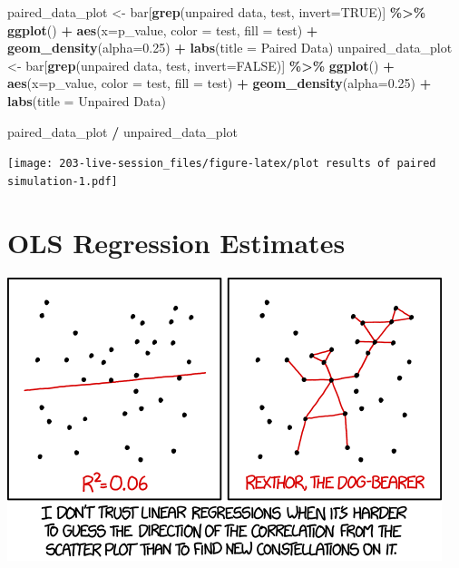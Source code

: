 \documentclass[
]{book}
\newenvironment{Shaded}{\begin{snugshade}}{\end{snugshade}}
\newcommand{\AttributeTok}[1]{\textcolor[rgb]{0.13,0.29,0.53}{#1}}
\newcommand{\ConstantTok}[1]{\textcolor[rgb]{0.56,0.35,0.01}{#1}}
\newcommand{\FloatTok}[1]{\textcolor[rgb]{0.00,0.00,0.81}{#1}}
\newcommand{\FunctionTok}[1]{\textcolor[rgb]{0.13,0.29,0.53}{\textbf{#1}}}
\newcommand{\NormalTok}[1]{#1}
\newcommand{\OtherTok}[1]{\textcolor[rgb]{0.56,0.35,0.01}{#1}}
\newcommand{\SpecialCharTok}[1]{\textcolor[rgb]{0.81,0.36,0.00}{\textbf{#1}}}
\newcommand{\StringTok}[1]{\textcolor[rgb]{0.31,0.60,0.02}{#1}}
\theoremstyle{definition}
\theoremstyle{definition}
\theoremstyle{definition}
\theoremstyle{definition}
\theoremstyle{remark}
\begin{document}
\begin{Shaded}
\begin{Highlighting}[]
\NormalTok{paired\_data\_plot }\OtherTok{\textless{}{-}}\NormalTok{ bar[}\FunctionTok{grep}\NormalTok{(}\StringTok{\textquotesingle{}unpaired data\textquotesingle{}}\NormalTok{, test, }\AttributeTok{invert=}\ConstantTok{TRUE}\NormalTok{)] }\SpecialCharTok{\%\textgreater{}\%} 
  \FunctionTok{ggplot}\NormalTok{() }\SpecialCharTok{+} 
    \FunctionTok{aes}\NormalTok{(}\AttributeTok{x=}\NormalTok{p\_value, }\AttributeTok{color =}\NormalTok{ test, }\AttributeTok{fill =}\NormalTok{ test) }\SpecialCharTok{+} 
    \FunctionTok{geom\_density}\NormalTok{(}\AttributeTok{alpha=}\FloatTok{0.25}\NormalTok{) }\SpecialCharTok{+} 
  \FunctionTok{labs}\NormalTok{(}\AttributeTok{title =} \StringTok{\textquotesingle{}Paired Data\textquotesingle{}}\NormalTok{)}
\NormalTok{unpaired\_data\_plot }\OtherTok{\textless{}{-}}\NormalTok{ bar[}\FunctionTok{grep}\NormalTok{(}\StringTok{\textquotesingle{}unpaired data\textquotesingle{}}\NormalTok{, test, }\AttributeTok{invert=}\ConstantTok{FALSE}\NormalTok{)] }\SpecialCharTok{\%\textgreater{}\%} 
  \FunctionTok{ggplot}\NormalTok{() }\SpecialCharTok{+} 
    \FunctionTok{aes}\NormalTok{(}\AttributeTok{x=}\NormalTok{p\_value, }\AttributeTok{color =}\NormalTok{ test, }\AttributeTok{fill =}\NormalTok{ test) }\SpecialCharTok{+} 
    \FunctionTok{geom\_density}\NormalTok{(}\AttributeTok{alpha=}\FloatTok{0.25}\NormalTok{) }\SpecialCharTok{+} 
  \FunctionTok{labs}\NormalTok{(}\AttributeTok{title =} \StringTok{\textquotesingle{}Unpaired Data\textquotesingle{}}\NormalTok{)}

\NormalTok{paired\_data\_plot }\SpecialCharTok{/}\NormalTok{ unpaired\_data\_plot}
\end{Highlighting}
\end{Shaded}

\texttt{[image: 203-live-session\_files/figure-latex/plot results of paired simulation-1.pdf]}

\hypertarget{ols-regression-estimates}{%
\chapter{OLS Regression Estimates}\label{ols-regression-estimates}}

\includegraphics{./images/linear_regression.png}
\end{document}
